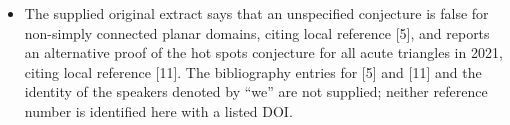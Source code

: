 \documentclass[11pt]{article}
\begin{document}
\begin{itemize}
\item The supplied original extract says that an unspecified conjecture is false for non-simply connected planar domains, citing local reference [5], and reports an alternative proof of the hot spots conjecture for all acute triangles in 2021, citing local reference [11]. The bibliography entries for [5] and [11] and the identity of the speakers denoted by ``we'' are not supplied; neither reference number is identified here with a listed DOI.
\end{itemize}
\end{document}
